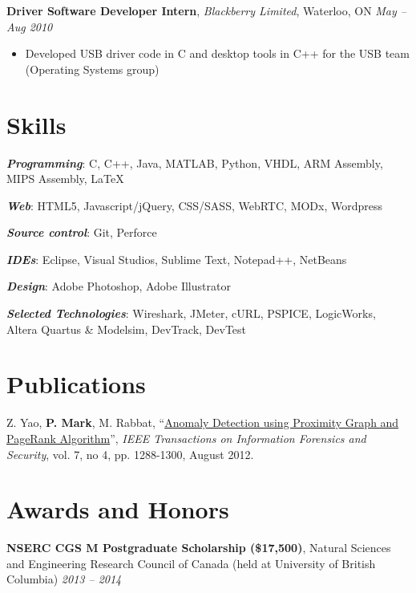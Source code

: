 \documentclass[letterpaper]{article}
\newcommand{\jobtitle}[4]{
  \textbf{#1}, \emph{#2}, {#3} \hfill \emph{#4}\\
}
\newenvironment{jobdescription}{
  \vspace{-4pt}
  \begin{itemize}
  \setlength{\itemsep}{2pt}
  \setlength{\parskip}{0pt}
  \setlength{\parsep}{0pt}
}{\end{itemize}}
\newcommand{\itemdescription}[3]{
  \textbf{#1}, {#2} \hfill \emph{#3}\\
  \medskip
}
\begin{document}
\jobtitle{Driver Software Developer Intern}{Blackberry
Limited}{Waterloo, ON}{May -- Aug 2010} 
\begin{jobdescription}
  \item Developed USB driver code in C and desktop tools in C++ for the USB
  team (Operating Systems group)
\end{jobdescription}

\medskip

\section*{Skills}
\emph{\textbf{Programming}}: C, C++, Java, MATLAB, Python, VHDL, ARM Assembly,
MIPS Assembly, \LaTeX\\
\medskip

\emph{\textbf{Web}}: HTML5, Javascript/jQuery, CSS/SASS, WebRTC, MODx, Wordpress
\medskip

\emph{\textbf{Source control}}: Git, Perforce
\medskip

\emph{\textbf{IDEs}}: Eclipse, Visual Studios, Sublime Text, Notepad++, NetBeans
\medskip

\emph{\textbf{Design}}: Adobe Photoshop, Adobe Illustrator
\medskip

\emph{\textbf{Selected Technologies}}: Wireshark, JMeter, cURL, PSPICE,
LogicWorks, Altera Quartus \& Modelsim, DevTrack, DevTest\\
\bigskip

\hypertarget{sec:publications}{}
\section*{Publications}
Z. Yao, \textbf{P. Mark}, M. Rabbat, 
``\href{http://ieeexplore.ieee.org/xpl/articleDetails.jsp?arnumber=6175122}
{Anomaly Detection using Proximity Graph and PageRank Algorithm}'', \emph{IEEE 
Transactions on Information Forensics and Security}, vol. 7, no 4, pp. 
1288-1300, August 2012.
\bigskip

\section*{Awards and Honors}
\itemdescription{NSERC CGS M Postgraduate Scholarship (\$17,500)}{Natural 
Sciences and Engineering Research Council of Canada (held at University of
British Columbia)}{2013 -- 2014}
\end{document}
